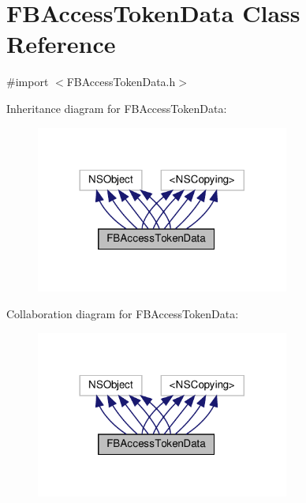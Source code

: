 \hypertarget{interfaceFBAccessTokenData}{}\section{F\+B\+Access\+Token\+Data Class Reference}
\label{interfaceFBAccessTokenData}


{\ttfamily \#import $<$F\+B\+Access\+Token\+Data.\+h$>$}



Inheritance diagram for F\+B\+Access\+Token\+Data\+:
\nopagebreak
\begin{figure}[H]
\begin{center}
\leavevmode
\includegraphics[width=236pt]{interfaceFBAccessTokenData__inherit__graph}
\end{center}
\end{figure}


Collaboration diagram for F\+B\+Access\+Token\+Data\+:
\nopagebreak
\begin{figure}[H]
\begin{center}
\leavevmode
\includegraphics[width=236pt]{interfaceFBAccessTokenData__coll__graph}
\end{center}
\end{figure}
